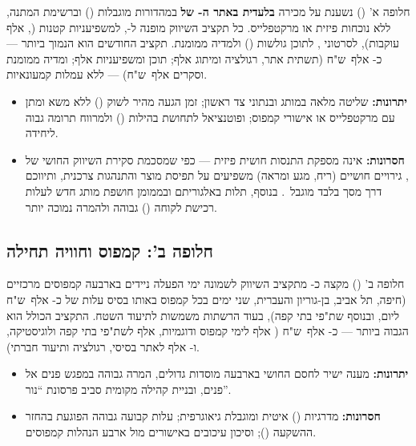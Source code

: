 חלופה א' () נשענת על מכירה \textbf{בלעדית באתר
ה- של } במהדורות מוגבלות () וברשימת המתנה, ללא נוכחות
פיזית או מרקטפלייס. כל תקציב השיווק מופנה ל-, למשפיעניות קטנות
(,  אלף עוקבות), לסרטוני , לתוכן
גולשות () ולמדיה ממומנת. תקציב  החודשים הוא הנמוך ביותר ---
כ- אלף~ש"ח (תשתית אתר, רגולציה ומיתוג  אלף; תוכן ומשפיעניות
 אלף; ומדיה ממומנת וסקרים  אלף~ש"ח) --- ללא עמלות קמעונאיות.

\begin{itemize}
  \item \textbf{יתרונות:} שליטה מלאה במותג ובנתוני צד ראשון; זמן הגעה מהיר לשוק
    () ללא משא ומתן עם מרקטפלייס או אישורי קמפוס; ופוטנציאל
    לתחושת בהילות () ולמרווח תרומה גבוה ליחידה.
  \item \textbf{חסרונות:} אינה מספקת התנסות חושית פיזית --- כפי שמסכמת סקירת
    השיווק החושי של , גירויים חושיים (ריח, מגע ומראה) משפיעים על
    תפיסת מוצר והתנהגות צרכנית, ותיווכם דרך מסך בלבד מוגבל~\cite{krishna2012sensory}.
    בנוסף, תלות באלגוריתם ובממומן חושפת מותג חדש לעלות רכישת לקוחה ()
    גבוהה ולהמרה נמוכה יותר.
\end{itemize}

\subsection{חלופה ב': קמפוס וחוויה תחילה}
\label{subsec:alt-campus}

חלופה ב' () מקצה כ- מתקציב השיווק
לשמונה ימי הפעלה ניידים בארבעה קמפוסים מרכזיים (חיפה, תל אביב, בן-גוריון
והעברית, שני ימים בכל קמפוס באותו בסיס עלות של כ- אלף~ש"ח ליום,
ובנוסף שת"פי בתי קפה), בעוד הרשתות משמשות לתיעוד השטח. התקציב הכולל הוא הגבוה
ביותר --- כ- אלף~ש"ח ( אלף לימי קמפוס ודוגמיות,  אלף
לשת"פי בתי קפה ולוגיסטיקה, ו- אלף לאתר בסיסי, רגולציה ותיעוד חברתי).

\begin{itemize}
  \item \textbf{יתרונות:} מענה ישיר לחסם החושי בארבעה מוסדות גדולים, המרה גבוהה
    במפגש פנים אל פנים, ובניית קהילה מקומית סביב פרסונת ``נור''.
  \item \textbf{חסרונות:} מדרגיות () איטית ומוגבלת גיאוגרפית;
    עלות קבועה גבוהה הפוגעת בהחזר ההשקעה (); וסיכון עיכובים באישורים
    מול ארבע הנהלות קמפוסים.
\end{itemize}

